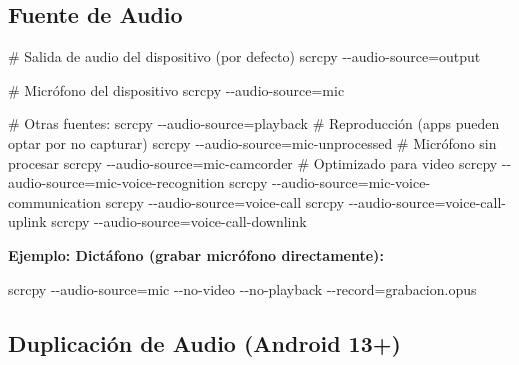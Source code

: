 \documentclass[
  doc,
  floatsintext,
  longtable,
  a4paper,
  nolmodern,
  notxfonts,
  notimes,
  12pt,
  colorlinks=true,linkcolor=blue,citecolor=blue,urlcolor=blue]{apa7}
\newenvironment{Shaded}{\begin{snugshade}}{\end{snugshade}}
\newcommand{\AttributeTok}[1]{\textcolor[rgb]{0.40,0.45,0.13}{#1}}
\newcommand{\CommentTok}[1]{\textcolor[rgb]{0.37,0.37,0.37}{#1}}
\newcommand{\ExtensionTok}[1]{\textcolor[rgb]{0.00,0.23,0.31}{#1}}
\newcommand{\NormalTok}[1]{\textcolor[rgb]{0.00,0.23,0.31}{#1}}
\newcommand{\OperatorTok}[1]{\textcolor[rgb]{0.37,0.37,0.37}{#1}}
\begin{document}
\subsection{Fuente de Audio}\label{fuente-de-audio}

\begin{Shaded}
\begin{Highlighting}[]
\CommentTok{\# Salida de audio del dispositivo (por defecto)}
\ExtensionTok{scrcpy} \AttributeTok{{-}{-}audio{-}source}\OperatorTok{=}\NormalTok{output}

\CommentTok{\# Micrófono del dispositivo}
\ExtensionTok{scrcpy} \AttributeTok{{-}{-}audio{-}source}\OperatorTok{=}\NormalTok{mic}

\CommentTok{\# Otras fuentes:}
\ExtensionTok{scrcpy} \AttributeTok{{-}{-}audio{-}source}\OperatorTok{=}\NormalTok{playback            }\CommentTok{\# Reproducción (apps pueden optar por no capturar)}
\ExtensionTok{scrcpy} \AttributeTok{{-}{-}audio{-}source}\OperatorTok{=}\NormalTok{mic{-}unprocessed     }\CommentTok{\# Micrófono sin procesar}
\ExtensionTok{scrcpy} \AttributeTok{{-}{-}audio{-}source}\OperatorTok{=}\NormalTok{mic{-}camcorder       }\CommentTok{\# Optimizado para video}
\ExtensionTok{scrcpy} \AttributeTok{{-}{-}audio{-}source}\OperatorTok{=}\NormalTok{mic{-}voice{-}recognition}
\ExtensionTok{scrcpy} \AttributeTok{{-}{-}audio{-}source}\OperatorTok{=}\NormalTok{mic{-}voice{-}communication}
\ExtensionTok{scrcpy} \AttributeTok{{-}{-}audio{-}source}\OperatorTok{=}\NormalTok{voice{-}call}
\ExtensionTok{scrcpy} \AttributeTok{{-}{-}audio{-}source}\OperatorTok{=}\NormalTok{voice{-}call{-}uplink}
\ExtensionTok{scrcpy} \AttributeTok{{-}{-}audio{-}source}\OperatorTok{=}\NormalTok{voice{-}call{-}downlink}
\end{Highlighting}
\end{Shaded}

\textbf{Ejemplo: Dictáfono (grabar micrófono directamente):}

\begin{Shaded}
\begin{Highlighting}[]
\ExtensionTok{scrcpy} \AttributeTok{{-}{-}audio{-}source}\OperatorTok{=}\NormalTok{mic }\AttributeTok{{-}{-}no{-}video} \AttributeTok{{-}{-}no{-}playback} \AttributeTok{{-}{-}record}\OperatorTok{=}\NormalTok{grabacion.opus}
\end{Highlighting}
\end{Shaded}

\subsection{Duplicación de Audio (Android
13+)}\label{duplicaciuxf3n-de-audio-android-13}
\end{document}
